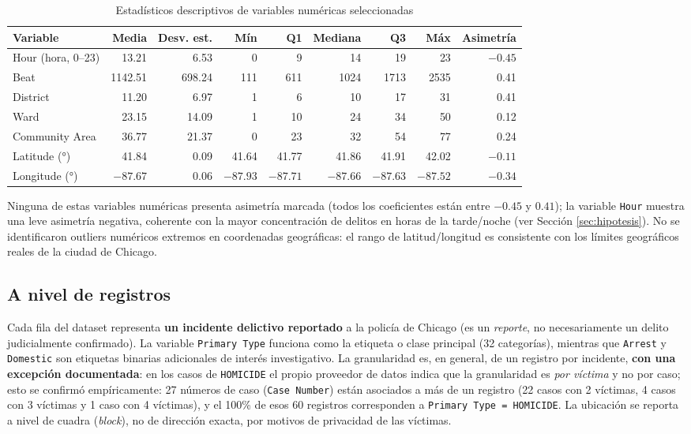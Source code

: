 \documentclass[11pt,a4paper]{article}
\begin{document}
\begin{table}[H]
\centering
\caption{Estadísticos descriptivos de variables numéricas seleccionadas}
\label{tab:descriptivos}
\small
\begin{tabular}{lrrrrrrrr}
\toprule
Variable & Media & Desv. est. & Mín & Q1 & Mediana & Q3 & Máx & Asimetría\\
\midrule
Hour (hora, 0--23) & 13.21 & 6.53 & 0 & 9 & 14 & 19 & 23 & $-0.45$\\
Beat & 1142.51 & 698.24 & 111 & 611 & 1024 & 1713 & 2535 & 0.41\\
District & 11.20 & 6.97 & 1 & 6 & 10 & 17 & 31 & 0.41\\
Ward & 23.15 & 14.09 & 1 & 10 & 24 & 34 & 50 & 0.12\\
Community Area & 36.77 & 21.37 & 0 & 23 & 32 & 54 & 77 & 0.24\\
Latitude (°) & 41.84 & 0.09 & 41.64 & 41.77 & 41.86 & 41.91 & 42.02 & $-0.11$\\
Longitude (°) & $-87.67$ & 0.06 & $-87.93$ & $-87.71$ & $-87.66$ & $-87.63$ & $-87.52$ & $-0.34$\\
\bottomrule
\end{tabular}
\end{table}

Ninguna de estas variables numéricas presenta asimetría marcada (todos los
coeficientes están entre $-0.45$ y $0.41$); la variable \texttt{Hour}
muestra una leve asimetría negativa, coherente con la mayor concentración de
delitos en horas de la tarde/noche (ver Sección \ref{sec:hipotesis}). No se
identificaron outliers numéricos extremos en coordenadas geográficas: el
rango de latitud/longitud es consistente con los límites geográficos reales
de la ciudad de Chicago.

\subsection{A nivel de registros}

Cada fila del dataset representa \textbf{un incidente delictivo reportado} a
la policía de Chicago (es un \emph{reporte}, no necesariamente un delito
judicialmente confirmado). La variable \texttt{Primary Type} funciona como
la etiqueta o clase principal (32 categorías), mientras que \texttt{Arrest}
y \texttt{Domestic} son etiquetas binarias adicionales de interés
investigativo. La granularidad es, en general, de un registro por incidente,
\textbf{con una excepción documentada}: en los casos de \texttt{HOMICIDE} el
propio proveedor de datos indica que la granularidad es \emph{por víctima}
y no por caso; esto se confirmó empíricamente: 27 números de caso
(\texttt{Case Number}) están asociados a más de un registro (22 casos con 2
víctimas, 4 casos con 3 víctimas y 1 caso con 4 víctimas), y el 100\% de
esos 60 registros corresponden a \texttt{Primary Type = HOMICIDE}. La
ubicación se reporta a nivel de cuadra (\textit{block}), no de dirección
exacta, por motivos de privacidad de las víctimas.
\end{document}
